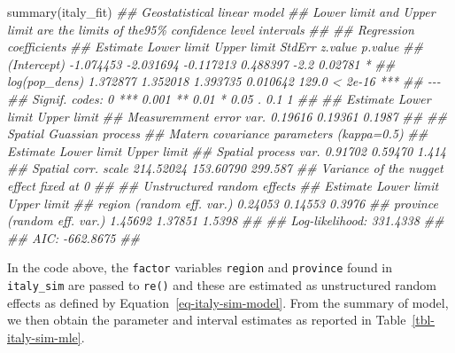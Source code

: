 \documentclass[
  letterpaper,
]{krantz}
\newenvironment{Shaded}{\begin{snugshade}}{\end{snugshade}}
\newcommand{\DocumentationTok}[1]{\textcolor[rgb]{0.37,0.37,0.37}{\textit{#1}}}
\newcommand{\FunctionTok}[1]{\textcolor[rgb]{0.28,0.35,0.67}{#1}}
\newcommand{\NormalTok}[1]{\textcolor[rgb]{0.00,0.23,0.31}{#1}}
\begin{document}
\begin{Shaded}
\begin{Highlighting}[]
\FunctionTok{summary}\NormalTok{(italy\_fit)}
\DocumentationTok{\#\# Geostatistical linear model }
\DocumentationTok{\#\# \textquotesingle{}Lower limit\textquotesingle{} and \textquotesingle{}Upper limit\textquotesingle{} are the limits of the95\% confidence level intervals }
\DocumentationTok{\#\# }
\DocumentationTok{\#\#  Regression coefficients }
\DocumentationTok{\#\#                Estimate Lower limit Upper limit    StdErr z.value p.value    }
\DocumentationTok{\#\# (Intercept)   {-}1.074453   {-}2.031694   {-}0.117213  0.488397    {-}2.2 0.02781 *  }
\DocumentationTok{\#\# log(pop\_dens)  1.372877    1.352018    1.393735  0.010642   129.0 \textless{} 2e{-}16 ***}
\DocumentationTok{\#\# {-}{-}{-}}
\DocumentationTok{\#\# Signif. codes:  0 \textquotesingle{}***\textquotesingle{} 0.001 \textquotesingle{}**\textquotesingle{} 0.01 \textquotesingle{}*\textquotesingle{} 0.05 \textquotesingle{}.\textquotesingle{} 0.1 \textquotesingle{} \textquotesingle{} 1}
\DocumentationTok{\#\# }
\DocumentationTok{\#\#                          Estimate Lower limit Upper limit}
\DocumentationTok{\#\# Measuremment error var.  0.19616     0.19361      0.1987}
\DocumentationTok{\#\# }
\DocumentationTok{\#\#  Spatial Guassian process }
\DocumentationTok{\#\# Matern covariance parameters (kappa=0.5) }
\DocumentationTok{\#\#                       Estimate Lower limit Upper limit}
\DocumentationTok{\#\# Spatial process var.   0.91702     0.59470       1.414}
\DocumentationTok{\#\# Spatial corr. scale  214.52024   153.60790     299.587}
\DocumentationTok{\#\# Variance of the nugget effect fixed at 0 }
\DocumentationTok{\#\# }
\DocumentationTok{\#\#  Unstructured random effects }
\DocumentationTok{\#\#                             Estimate Lower limit Upper limit}
\DocumentationTok{\#\# region (random eff. var.)    0.24053     0.14553      0.3976}
\DocumentationTok{\#\# province (random eff. var.)  1.45692     1.37851      1.5398}
\DocumentationTok{\#\# }
\DocumentationTok{\#\#  Log{-}likelihood: 331.4338}
\DocumentationTok{\#\# }
\DocumentationTok{\#\#  AIC: {-}662.8675}
\DocumentationTok{\#\# }
\end{Highlighting}
\end{Shaded}

In the code above, the \texttt{factor} variables \texttt{region} and
\texttt{province} found in \texttt{italy\_sim} are passed to
\texttt{re()} and these are estimated as unstructured random effects as
defined by Equation~\ref{eq-italy-sim-model}. From the summary of model,
we then obtain the parameter and interval estimates as reported in
Table~\ref{tbl-italy-sim-mle}.
\end{document}
